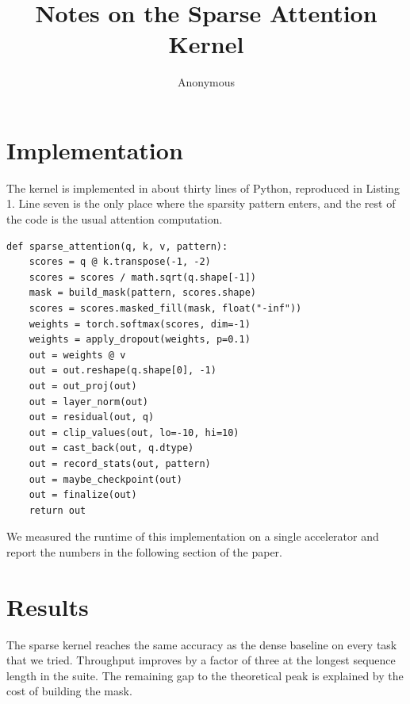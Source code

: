 \documentclass[10pt]{article}
\title{Notes on the Sparse Attention Kernel}
\author{Anonymous}
\date{}
\newcommand{\s}[1]{#1}
\begin{document}
\maketitle

\section{Implementation}

\s{The kernel is implemented in about thirty lines of Python, reproduced in Listing 1.}
\s{Line seven is the only place where the sparsity pattern enters, and the rest of the code is the usual attention computation.}

\begin{lstlisting}
def sparse_attention(q, k, v, pattern):
    scores = q @ k.transpose(-1, -2)
    scores = scores / math.sqrt(q.shape[-1])
    mask = build_mask(pattern, scores.shape)
    scores = scores.masked_fill(mask, float("-inf"))
    weights = torch.softmax(scores, dim=-1)
    weights = apply_dropout(weights, p=0.1)
    out = weights @ v
    out = out.reshape(q.shape[0], -1)
    out = out_proj(out)
    out = layer_norm(out)
    out = residual(out, q)
    out = clip_values(out, lo=-10, hi=10)
    out = cast_back(out, q.dtype)
    out = record_stats(out, pattern)
    out = maybe_checkpoint(out)
    out = finalize(out)
    return out
\end{lstlisting}

\s{We measured the runtime of this implementation on a single accelerator and report the numbers in the following section of the paper.}

\section{Results}

\s{The sparse kernel reaches the same accuracy as the dense baseline on every task that we tried.}
\s{Throughput improves by a factor of three at the longest sequence length in the suite.}
\s{The remaining gap to the theoretical peak is explained by the cost of building the mask.}
\end{document}

